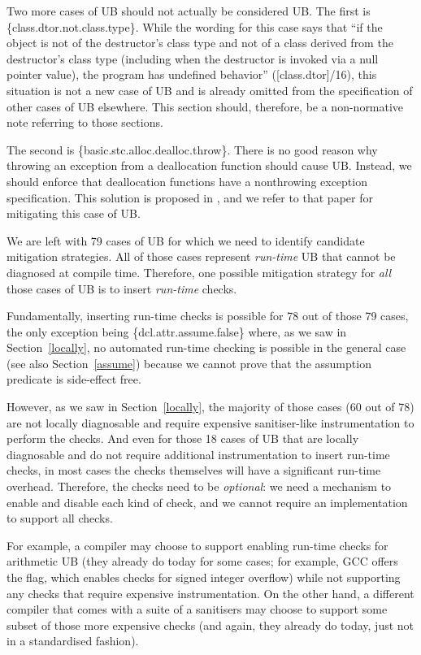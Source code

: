 Two more cases of UB should not actually be considered UB. The first is \{class.dtor.not.class.type\}. While the wording for this case says that ``if the object is not of the destructor's class type and not of a class derived from the destructor's class type (including when the destructor is invoked via a null pointer value), the program has undefined behavior'' ([class.dtor]/16),
this situation is not a new case of UB and is already omitted from the specification of other cases of UB elsewhere. This section should, therefore, be a non-normative note referring to those sections.

The second is \{basic.stc.alloc.dealloc.throw\}. There is no good reason why throwing an exception from a deallocation function should cause UB. Instead, we should enforce that deallocation functions have a nonthrowing exception specification. This solution is proposed in \cite{P3424R0}, and we refer to that paper for mitigating this case of UB.

We are left with 79 cases of UB for which we need to identify candidate mitigation strategies. All of those cases represent \emph{run-time} UB that cannot be diagnosed at compile time. Therefore, one possible mitigation strategy for \emph{all} those cases of UB is to insert \emph{run-time} checks.

Fundamentally, inserting run-time checks is possible for 78 out of those 79 cases, the only exception being \{dcl.attr.assume.false\} where, as we saw in Section~\ref{locally}, no automated run-time checking is possible in the general case (see also Section~\ref{assume}) because we cannot prove that the assumption predicate is side-effect free.

However, as we saw in Section~\ref{locally}, the majority of those cases (60 out of 78) are not locally diagnosable and require expensive sanitiser-like instrumentation to perform the checks. And even for those 18 cases of UB that are locally diagnosable and do not require additional instrumentation to insert run-time checks, in most cases the checks themselves will have a significant run-time overhead. Therefore, the checks need to be \emph{optional}: we need a mechanism to enable and disable each kind of check, and we cannot require an implementation to support all checks.

For example, a compiler may choose to support enabling run-time checks for arithmetic UB (they already do today for some cases; for example, GCC offers the  flag, which enables checks for signed integer overflow) while not supporting any checks that require expensive instrumentation. On the other hand, a different compiler that comes with a suite of a sanitisers may choose to support some subset of those more expensive checks (and again, they already do today, just not in a standardised fashion).

